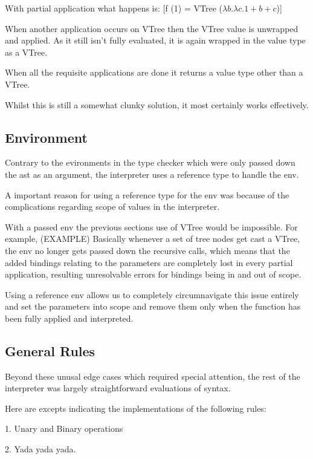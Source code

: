 \documentclass{l4proj}
\begin{document}
With partial application what happens is: [f (1) = VTree ($\lambda b. \lambda c. 1 + b + c$)]

When another application occurs on VTree then the VTree value is unwrapped and applied.
As it still isn't fully evaluated, it is again wrapped in the value type as a VTree.

When all the requisite applications are done it returns a value type other than a VTree.

Whilst this is still a somewhat clunky solution, it most certainly works effectively.

\subsection{Environment}

Contrary to the evironments in the type checker which were only passed down the ast as an argument, the interpreter uses a reference type to handle the env.

A important reason for using a reference type for the env was because of the complications regarding scope of values in the interpreter.

With a passed env the previous sections use of VTree would be impossible.
For example, (EXAMPLE) Basically whenever a set of tree nodes get cast a VTree, the env no longer gets passed down the recursive calls, which means that the added bindings relating to the parameters are completely lost in every partial application, resulting unresolvable errors for bindings being in and out of scope.

Using a reference env allows us to completely circumnavigate this issue entirely and set the parameters into scope and remove them only when the function has been fully applied and interpreted.

\subsection{General Rules}
Beyond these unusal edge cases which required special attention, the rest of the interpreter was largely straightforward evaluations of syntax.

Here are excepts indicating the implementations of the following rules:

1. Unary and Binary operations

2. Yada yada yada.

\end{document}
